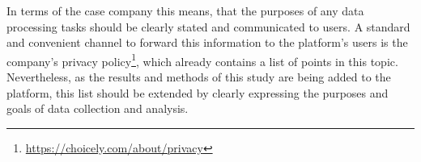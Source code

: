 In terms of the case company this means, that the purposes of any data processing tasks should be clearly stated and communicated to users. A standard and convenient channel to forward this information to the platform's users is the company's privacy policy\footnote{\url{https://choicely.com/about/privacy}}, which already contains a list of points in this topic. Nevertheless, as the results and methods of this study are being added to the platform, this list should be extended by clearly expressing the purposes and goals of data collection and analysis.

